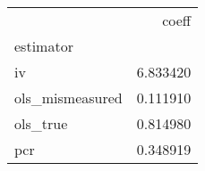 \begin{tabular}{lr}
\toprule
{} &     coeff \\
estimator       &           \\
\midrule
iv              &  6.833420 \\
ols\_mismeasured &  0.111910 \\
ols\_true        &  0.814980 \\
pcr             &  0.348919 \\
\bottomrule
\end{tabular}
